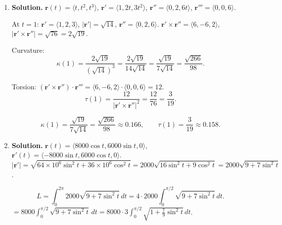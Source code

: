 \begin{enumerate}
Hint says $|\mathbf{r}'|$ simplifies nicely. Indeed: $\sqrt{3+4t^2}$. Let us check if $3+4t^2$ is a perfect square... Not in general, but $\sqrt{3+4t^2}$ can be integrated.

$s(t)=\int_0^t\sqrt{3+4u^2}\,du$. Let $2u=\sqrt{3}\sinh\phi$:
\[
s(t) = \frac{\sqrt{3}}{4}\bigl[2t\sqrt{3+4t^2}/\sqrt{3}+\sqrt{3}\,\sinh^{-1}(2t/\sqrt{3})\bigr] = \frac{1}{2}\,t\sqrt{3+4t^2}+\frac{3}{4}\ln\!\left(\frac{2t+\sqrt{3+4t^2}}{\sqrt{3}}\right).
\]

The expression $\sqrt{3+4t^2}$ does not simplify further. The arc length is:
\[
s(t)=\int_0^t\sqrt{3+4u^2}\,du = \frac{t\sqrt{3+4t^2}}{2}+\frac{3}{4}\ln\!\left(\frac{2t+\sqrt{3+4t^2}}{\sqrt{3}}\right).
\]
The reparameterization is $\mathbf{r}(s)=\mathbf{r}(t(s))$ where $t(s)$ is the inverse of the above.

\[
\boxed{s(t)=\frac{t}{2}\sqrt{3+4t^2}+\frac{3}{4}\ln\!\left(\frac{2t+\sqrt{3+4t^2}}{\sqrt{3}}\right);\quad \mathbf{r}(s)=\langle t(s),\;\sqrt{2}\,t(s),\;t(s)^2\rangle.}
\]

\item \textbf{Solution.}
$\mathbf{r}(t)=\langle t, t^2, t^3\rangle$, $\mathbf{r}'=\langle 1,2t,3t^2\rangle$, $\mathbf{r}''=\langle 0,2,6t\rangle$, $\mathbf{r}'''=\langle 0,0,6\rangle$.

At $t=1$: $\mathbf{r}'=\langle 1,2,3\rangle$, $|\mathbf{r}'|=\sqrt{14}$, $\mathbf{r}''=\langle 0,2,6\rangle$.
$\mathbf{r}'\times\mathbf{r}''=\langle 6,-6,2\rangle$, $|\mathbf{r}'\times\mathbf{r}''|=\sqrt{76}=2\sqrt{19}$.

Curvature:
\[
\kappa(1)=\frac{2\sqrt{19}}{(\sqrt{14})^3}=\frac{2\sqrt{19}}{14\sqrt{14}}=\frac{\sqrt{19}}{7\sqrt{14}}=\frac{\sqrt{266}}{98}.
\]

Torsion:
$(\mathbf{r}'\times\mathbf{r}'')\cdot\mathbf{r}'''=\langle 6,-6,2\rangle\cdot\langle 0,0,6\rangle=12$.
\[
\tau(1)=\frac{12}{|\mathbf{r}'\times\mathbf{r}''|^2}=\frac{12}{76}=\frac{3}{19}.
\]

\[
\boxed{\kappa(1)=\frac{\sqrt{19}}{7\sqrt{14}}=\frac{\sqrt{266}}{98}\approx 0.166, \qquad \tau(1)=\frac{3}{19}\approx 0.158.}
\]

\item \textbf{Solution.}
$\mathbf{r}(t)=\langle 8000\cos t, 6000\sin t, 0\rangle$, $\mathbf{r}'(t)=\langle -8000\sin t, 6000\cos t, 0\rangle$.
$|\mathbf{r}'|=\sqrt{64\times 10^6\sin^2 t+36\times 10^6\cos^2 t}=2000\sqrt{16\sin^2 t+9\cos^2 t}=2000\sqrt{9+7\sin^2 t}$.

\[
L=\int_0^{2\pi}2000\sqrt{9+7\sin^2 t}\,dt = 4\cdot 2000\int_0^{\pi/2}\sqrt{9+7\sin^2 t}\,dt.
\]
$= 8000\int_0^{\pi/2}\sqrt{9+7\sin^2 t}\,dt = 8000\cdot 3\int_0^{\pi/2}\sqrt{1+\frac{7}{9}\sin^2 t}\,dt$.


\end{enumerate}
